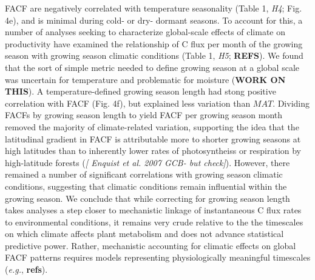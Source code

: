 \documentclass[]{article}
\begin{document}
FACF are negatively correlated with temperature seasonality (Table 1,
\emph{H4}; Fig. 4e), and is minimal during cold- or dry- dormant
seasons. To account for this, a number of analyses seeking to
characterize global-scale effects of climate on productivity have
examined the relationship of C flux per month of the growing season with
growing season climatic conditions (Table 1, \emph{H5}; \textbf{REFS}).
We found that the sort of simple metric needed to define growing season
at a global scale was uncertain for temperature and problematic for
moisture (\textbf{WORK ON THIS}). A temperature-defined growing season
length had stong positive correlation with FACF (Fig. 4f), but explained
less variation than \(MAT\). Dividing FACFs by growing season length to
yield FACF per growing season month removed the majority of
climate-related variation, supporting the idea that the latitudinal
gradient in FACF is attributable more to shorter growing seasons at high
latitudes than to inherently lower rates of photosyntheiss or
respiration by high-latitude forests (\emph{{[} Enquist et al. 2007 GCB-
but check{]}}). However, there remained a number of significant
correlations with growing season climatic conditions, suggesting that
climatic conditions remain influential within the growing season. We
conclude that while correcting for growing season length takes analyses
a step closer to mechanistic linkage of instantaneous C flux rates to
environmental conditions, it remains very crude relative to the the
timescales on which climate affects plant metabolism and does not
advance statistical predictive power. Rather, mechanistic accounting for
climatic effects on global FACF patterns requires models representing
physiologically meaningful timescales (\emph{e.g.}, \textbf{refs}).
\end{document}
